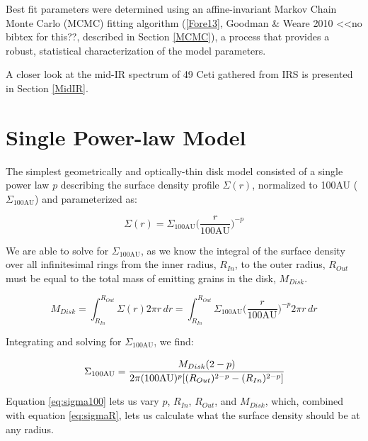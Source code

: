 Best fit parameters were determined using an affine-invariant Markov Chain Monte Carlo (MCMC) fitting algorithm (\ref{Fore13}, Goodman \& Weare 2010 <<no bibtex for this??, described in Section \ref{MCMC}), a process that provides a robust, statistical characterization of the model parameters. 

A closer look at the mid-IR spectrum of 49 Ceti gathered from IRS is presented in Section \ref{MidIR}. 


\section{Single Power-law Model}
\label{SinglePowerSED_Model}

The simplest geometrically and optically-thin disk model consisted of a single power law $p$ describing the surface density profile $\Sigma(r)$, normalized to 100AU ($\Sigma_{100\text{AU}}$) and parameterized as:

\begin{equation}\label{eq:sigmaR}
\Sigma(r) = \Sigma_{100\text{AU}}\Big(\frac{r}{100\text{AU}}\Big)^{-p}
\end{equation}

We are able to solve for $\Sigma_{100\text{AU}}$, as we know the integral of the surface density over all infinitesimal rings from the inner radius, $R_{In}$, to the outer radius, $R_{Out}$ must be equal to the total mass of emitting grains in the disk, $M_{Disk}$. 

\begin{equation}\label{eq:mdisk}
M_{Disk} = \int_{R_{In}}^{R_{Out}} \Sigma(r) 2 \pi r \,dr = \int_{R_{In}}^{R_{Out}} \Sigma_{100\text{AU}}\Big(\frac{r}{100\text{AU}}\Big)^{-p} 2 \pi r \,dr
\end{equation}

Integrating and solving for $\Sigma_{100\text{AU}}$, we find:

\begin{equation}\label{eq:sigma100}
\Sigma_{100\text{AU}} = \cfrac{M_{Disk} (2 - p)}{2\pi (100\text{AU})^{p} [(R_{Out})^{2-p}-(R_{In})^{2-p}]}
\end{equation}

Equation \ref{eq:sigma100} lets us vary $p$, $R_{In}$, $R_{Out}$, and $M_{Disk}$, which, combined with equation \ref{eq:sigmaR}, lets us calculate what the surface density should be at any radius. 

